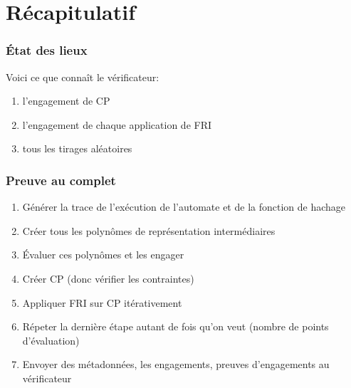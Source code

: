 \documentclass{beamer}
\begin{document}
\section{Récapitulatif}
\begin{frame}
\frametitle{État des lieux}
Voici ce que connaît le vérificateur:
\begin{enumerate}
    \item l'engagement de CP
    \item l'engagement de chaque application de FRI
    \item tous les tirages aléatoires
\end{enumerate}
\end{frame}

\begin{frame}
\frametitle{Preuve au complet}
\begin{enumerate}
    \item Générer la trace de l'exécution de l'automate et de la fonction de hachage
    \item Créer tous les polynômes de représentation intermédiaires
    \item Évaluer ces polynômes et les engager
    \item Créer CP (donc vérifier les contraintes)
    \item Appliquer FRI sur CP itérativement
    \item Répeter la dernière étape autant de fois qu'on veut (nombre de points d'évaluation)
    \item Envoyer des métadonnées, les engagements, preuves d'engagements au vérificateur
\end{enumerate}
\end{frame}
\end{document}
